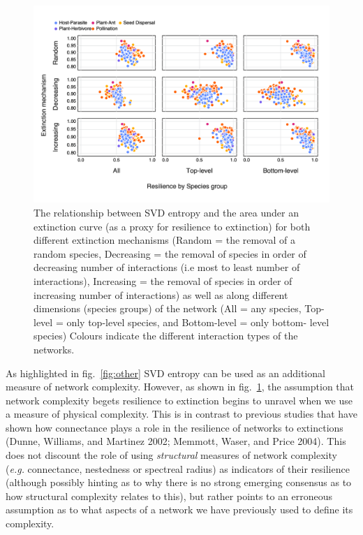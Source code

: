 \documentclass[10pt,oneside]{article}
\makeatletter
\def\maxwidth{\ifdim\Gin@nat@width>\linewidth\linewidth
\else\Gin@nat@width\fi}
\let\Oldincludegraphics\includegraphics
\renewcommand{\includegraphics}[1]{\Oldincludegraphics[width=\maxwidth]{#1}}
\makeatother
\begin{document}
\begin{figure}
\hypertarget{fig:resilience}{%
\centering
\includegraphics{figures/entropy_v_AUCall.png}
\caption{The relationship between SVD entropy and the area under an
extinction curve (as a proxy for resilience to extinction) for both
different extinction mechanisms (Random = the removal of a random
species, Decreasing = the removal of species in order of decreasing
number of interactions (i.e most to least number of interactions),
Increasing = the removal of species in order of increasing number of
interactions) as well as along different dimensions (species groups) of
the network (All = any species, Top-level = only top-level species, and
Bottom-level = only bottom- level species) Colours indicate the
different interaction types of the networks.}\label{fig:resilience}
}
\end{figure}

As highlighted in fig.~\ref{fig:other} SVD entropy can be used as an
additional measure of network complexity. However, as shown in
fig.~\ref{fig:resilience}, the assumption that network complexity begets
resilience to extinction begins to unravel when we use a measure of
physical complexity. This is in contrast to previous studies that have
shown how connectance plays a role in the resilience of networks to
extinctions (Dunne, Williams, and Martinez 2002; Memmott, Waser, and
Price 2004). This does not discount the role of using \emph{structural}
measures of network complexity (\emph{e.g.} connectance, nestedness or
spectreal radius) as indicators of their resilience (although possibly
hinting as to why there is no strong emerging consensus as to how
structural complexity relates to this), but rather points to an
erroneous assumption as to what aspects of a network we have previously
used to define its complexity.
\end{document}
